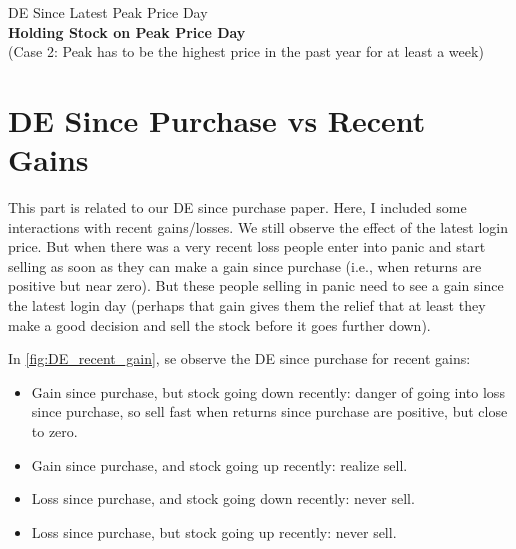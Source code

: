 \begin{econtable}[h]\footnotesize
	\caption{DE Since Latest Peak Price Day \\\textbf{ Holding Stock on Peak Price Day} \\ (Case 2: Peak has to be the highest price in the past year for at least a week) }
	\label{tab:}
\end{econtable}



\clearpage
\section{DE Since Purchase vs Recent Gains}

This part is related to our DE since purchase paper. Here, I included some interactions with recent gains/losses. We still observe the effect of the latest login price. But when there was a very recent loss people enter into panic and start selling as soon as they can make a gain since purchase (i.e., when returns are positive but near zero). But these people selling in panic need to see a gain since the latest login day (perhaps that gain gives them the relief that at least they make a good decision and sell the stock before it goes further down).


In \ref{fig:DE_recent_gain}, se observe the DE since purchase for recent gains: 

\begin{itemize}
	\item Gain since purchase, but stock going down recently: danger of going into loss since purchase, so sell fast when returns since purchase are positive, but close to zero. 
\item	Gain since purchase, and stock going up recently: realize sell. 
\item	Loss since purchase, and stock going down recently: never sell.

\item	Loss since purchase, but stock going up recently: never sell.
	
\end{itemize}

